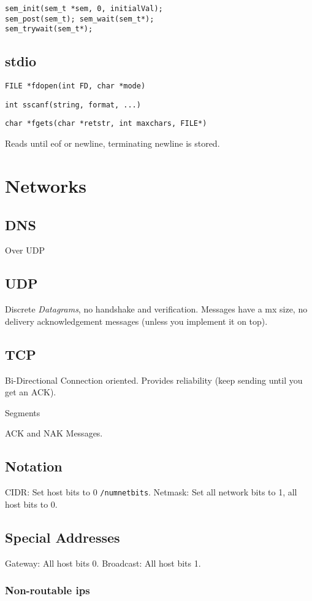 \documentclass[10pt, a4paper, leqno]{article}
\begin{document}
\begin{multicols}{2}
\begin{verbatim}
sem_init(sem_t *sem, 0, initialVal);
sem_post(sem_t); sem_wait(sem_t*); 
sem_trywait(sem_t*);
\end{verbatim}

\subsection {stdio}

\texttt{FILE *fdopen(int FD, char *mode)}

\texttt{int sscanf(string, format, ...)}

\texttt{char *fgets(char *retstr, int maxchars, FILE*)}

Reads until eof or newline, terminating newline is stored. 

\section {Networks}

\subsection {DNS}
Over UDP
\subsection {UDP}
Discrete \emph{Datagrams}, no handshake and verification. Messages have a mx size, no 
delivery acknowledgement messages (unless you implement it on top). 
\subsection {TCP}
Bi-Directional Connection oriented. Provides reliability (keep sending until you get an ACK).

Segments

ACK and NAK Messages. 

\subsection {Notation}

CIDR: Set host bits to 0 \texttt{/numnetbits}. Netmask: Set all network bits to 1, all host bits to 0.

\subsection {Special Addresses}
Gateway: All host bits 0. Broadcast: All host bits 1.
\subsubsection {Non-routable ips}


\end{multicols}
\end{document}
